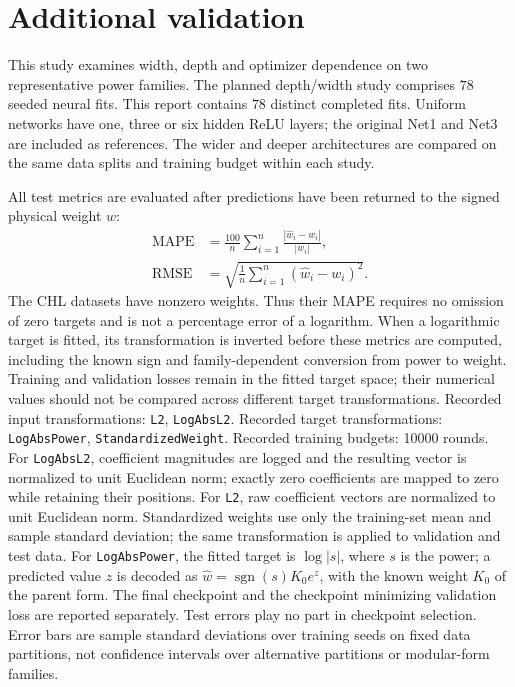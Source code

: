 \section{Additional validation}
\label{app:additional-validation}

This study examines width, depth and optimizer dependence on two representative power families. The planned depth/width study comprises $78$ seeded neural fits. This report contains $78$ distinct completed fits. Uniform networks have one, three or six hidden ReLU layers; the original Net1 and Net3 are included as references. The wider and deeper architectures are compared on the same data splits and training budget within each study.

All test metrics are evaluated after predictions have been returned to the signed physical weight $w$:
\begin{align}
 \mathrm{MAPE} &= \frac{100}{n}\sum_{i=1}^n
              \frac{|\widehat w_i-w_i|}{|w_i|},\\
 \mathrm{RMSE} &= \sqrt{\frac1n\sum_{i=1}^n(\widehat w_i-w_i)^2}.
\end{align}
The CHL datasets have nonzero weights. Thus their MAPE requires no omission of
zero targets and is not a percentage error of a logarithm. When a logarithmic
target is fitted, its transformation is inverted before these metrics are
computed, including the known sign and family-dependent conversion from power
to weight. Training and validation losses remain in the fitted target space;
their numerical values should not be compared across different target transformations.
Recorded input transformations: \texttt{L2}, \texttt{LogAbsL2}. Recorded target transformations:
\texttt{LogAbsPower}, \texttt{StandardizedWeight}. Recorded training budgets: 10000 rounds.
For \texttt{LogAbsL2}, coefficient magnitudes are logged and the resulting vector is normalized to unit Euclidean norm; exactly zero coefficients are mapped to zero while retaining their positions.
For \texttt{L2}, raw coefficient vectors are normalized to unit Euclidean norm.
Standardized weights use only the training-set mean and sample standard deviation; the same transformation is applied to validation and test data.
For \texttt{LogAbsPower}, the fitted target is $\log|s|$, where $s$ is the power; a predicted value $z$ is decoded as $\widehat w=\operatorname{sgn}(s)K_0 e^z$, with the known weight $K_0$ of the parent form.
The final checkpoint and the checkpoint minimizing validation loss are reported
separately. Test errors play no part in checkpoint selection. Error bars are sample
standard deviations over training seeds on fixed data partitions, not confidence
intervals over alternative partitions or modular-form families.

